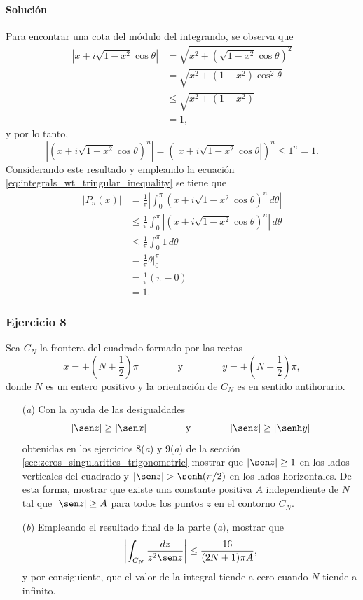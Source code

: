 \documentclass[a4paper]{report}
\begin{document}
\paragraph{Solución} Para encontrar una cota del módulo del integrando, se observa que 
\begin{align*}
 |x+i\sqrt{1-x^2}\cos\theta|&=\sqrt{x^2+\left(\sqrt{1-x^2}\cos\theta\right)^2}\\
   &=\sqrt{x^2+(1-x^2)\cos^2\theta}\\
   &\leq\sqrt{x^2+(1-x^2)}\\
   &=1,
\end{align*}
y por lo tanto,
\[
 |(x+i\sqrt{1-x^2}\cos\theta)^n|=(|x+i\sqrt{1-x^2}\cos\theta|)^n\leq1^n=1.
\]
Considerando este resultado y empleando la ecuación \ref{eq:integrals_wt_tringular_inequality} se tiene que
\begin{align*}
 |P_n(x)|&=\frac{1}{\pi}\left|\int_0^\pi(x+i\sqrt{1-x^2}\cos\theta)^n\,d\theta\right|\\
   &\leq\frac{1}{\pi}\int_0^\pi\left|(x+i\sqrt{1-x^2}\cos\theta)^n\right|\,d\theta\\
   &\leq\frac{1}{\pi}\int_0^\pi1\,d\theta\\
   &=\frac{1}{\pi}\theta\bigg|_0^\pi\\
   &=\frac{1}{\pi}(\pi-0)\\
   &=1.
\end{align*}

\subsubsection{Ejercicio 8}

Sea \(C_N\) la frontera del cuadrado formado por las rectas 
\[
 x=\pm\left(N+\frac{1}{2}\right)\pi
 \qquad\qquad\textrm{y}\qquad\qquad
 y=\pm\left(N+\frac{1}{2}\right)\pi,
\]
donde \(N\) es un entero positivo y la orientación de \(C_N\) es en sentido antihorario.
\begin{enumerate}
 \item[(\textit{a})] Con la ayuda de las desigualdades
 \[
  |\sen z|\geq|\sen x|
  \qquad\qquad\textrm{y}\qquad\qquad
  |\sen z|\geq|\senh y|
 \]
 obtenidas en los ejercicios 8(\textit{a}) y 9(\textit{a}) de la sección \ref{sec:zeros_singularities_trigonometric} mostrar que \(|\sen z|\geq1\) en los lados verticales del cuadrado y \(|\sen z|>\senh(\pi/2)\) en los lados horizontales. De esta forma, mostrar que existe una constante positiva \(A\) independiente de \(N\) tal que \(|\sen z|\geq A\) para todos los puntos \(z\) en el contorno \(C_N\).
 \item[(\textit{b})] Empleando el resultado final de la parte (\textit{a}), mostrar que 
 \[
  \left|\int_{C_N}\frac{dz}{z^2\sen z}\right|\leq\frac{16}{(2N+1)\pi A},
 \]
 y por consiguiente, que el valor de la integral tiende a cero cuando \(N\) tiende a infinito.
\end{enumerate}
\end{document}
